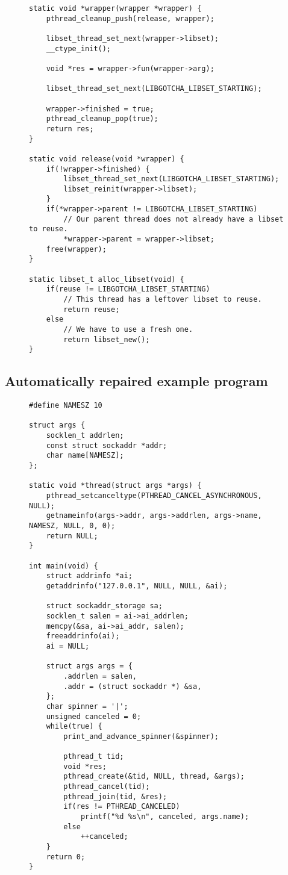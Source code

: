 \begin{figure}
\begin{lstlisting}[label=lst:acsafe_helpers,caption=\textit{libac-safe}'s thread initializer and cleanup handler]
static void *wrapper(wrapper *wrapper) {
	pthread_cleanup_push(release, wrapper);

	libset_thread_set_next(wrapper->libset);
	__ctype_init();

	void *res = wrapper->fun(wrapper->arg);

	libset_thread_set_next(LIBGOTCHA_LIBSET_STARTING);

	wrapper->finished = true;
	pthread_cleanup_pop(true);
	return res;
}

static void release(void *wrapper) {
	if(!wrapper->finished) {
		libset_thread_set_next(LIBGOTCHA_LIBSET_STARTING);
		libset_reinit(wrapper->libset);
	}
	if(*wrapper->parent != LIBGOTCHA_LIBSET_STARTING)
		// Our parent thread does not already have a libset to reuse.
		*wrapper->parent = wrapper->libset;
	free(wrapper);
}

static libset_t alloc_libset(void) {
	if(reuse != LIBGOTCHA_LIBSET_STARTING)
		// This thread has a leftover libset to reuse.
		return reuse;
	else
		// We have to use a fresh one.
		return libset_new();
}
\end{lstlisting}
\end{figure}


\subsection{Automatically repaired example program}

\begin{figure}
\begin{lstlisting}[label=lst:acsafe_example,caption=Example program using asynchronous thread cancellation]
#define NAMESZ 10

struct args {
	socklen_t addrlen;
	const struct sockaddr *addr;
	char name[NAMESZ];
};

static void *thread(struct args *args) {
	pthread_setcanceltype(PTHREAD_CANCEL_ASYNCHRONOUS, NULL);
	getnameinfo(args->addr, args->addrlen, args->name, NAMESZ, NULL, 0, 0);
	return NULL;
}

int main(void) {
	struct addrinfo *ai;
	getaddrinfo("127.0.0.1", NULL, NULL, &ai);

	struct sockaddr_storage sa;
	socklen_t salen = ai->ai_addrlen;
	memcpy(&sa, ai->ai_addr, salen);
	freeaddrinfo(ai);
	ai = NULL;

	struct args args = {
		.addrlen = salen,
		.addr = (struct sockaddr *) &sa,
	};
	char spinner = '|';
	unsigned canceled = 0;
	while(true) {
		print_and_advance_spinner(&spinner);

		pthread_t tid;
		void *res;
		pthread_create(&tid, NULL, thread, &args);
		pthread_cancel(tid);
		pthread_join(tid, &res);
		if(res != PTHREAD_CANCELED)
			printf("%d %s\n", canceled, args.name);
		else
			++canceled;
	}
	return 0;
}
\end{lstlisting}
\end{figure}

